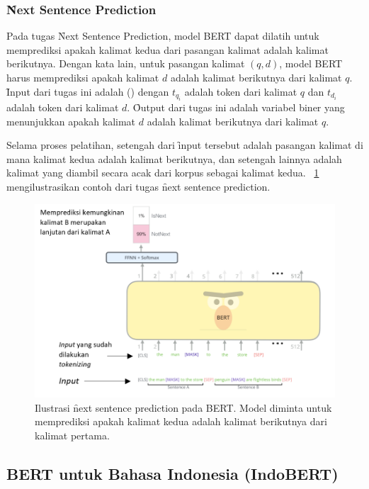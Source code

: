 	\subsubsection{\f{Next Sentence Prediction}}
	\label{sec:next-sentence-prediction}

	Pada tugas \f{Next Sentence Prediction}, model BERT dapat dilatih untuk memprediksi apakah kalimat kedua dari pasangan kalimat adalah kalimat berikutnya. Dengan kata lain, untuk pasangan kalimat $(q, d)$, model BERT harus memprediksi apakah kalimat $d$ adalah kalimat berikutnya dari kalimat $q$. \f{Input} dari tugas ini adalah () dengan $t_{q_i}$ adalah token dari kalimat $q$ dan $t_{d_i}$ adalah token dari kalimat $d$. \f{Output} dari tugas ini adalah variabel biner yang menunjukkan apakah kalimat $d$ adalah kalimat berikutnya dari kalimat $q$.
	
	Selama proses pelatihan, setengah dari \f{input} tersebut adalah pasangan kalimat di mana kalimat kedua adalah kalimat berikutnya, dan setengah lainnya adalah kalimat yang diambil secara acak dari korpus sebagai kalimat kedua. \pic~\ref{fig:next-sentence-prediction} mengilustrasikan contoh dari tugas \f{next sentence prediction}.

	\begin{figure}[!ht]
		\centering
		\includegraphics[width=1\textwidth]{assets/pics/Paste.png}
		\caption{Ilustrasi \f{next sentence prediction} pada BERT. Model diminta untuk memprediksi apakah kalimat kedua adalah kalimat berikutnya dari kalimat pertama.}
		\label{fig:next-sentence-prediction}
	\end{figure}

	
	\subsection{BERT untuk Bahasa Indonesia (IndoBERT)}

